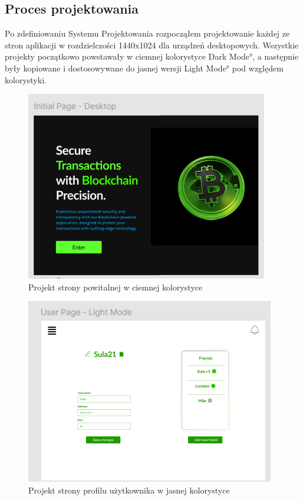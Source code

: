 \subsection{Proces projektowania}
\label{sec:ProcesProjektowania}
Po zdefiniowaniu Systemu Projektowania rozpocząłem projektowanie każdej ze stron aplikacji w rozdzielczości 1440x1024 dla urządzeń desktopowych. Wszystkie projekty początkowo powstawały w ciemnej kolorystyce \ang{Dark Mode}, a następnie były kopiowane i dostosowywane do jasnej wersji \ang{Light Mode} pod względem kolorystyki.
\begin{figure}[!ht]
    \centering
    \includegraphics[width=0.75\linewidth]{Images/figma_projektowanie_1.png}
    \caption{Projekt strony powitalnej w ciemnej kolorystyce}
    \label{fig:enter-label}
\end{figure}
\begin{figure}[!ht]
    \centering
    \includegraphics[width=0.75\linewidth]{Images/figma_projektowanie_2.png}
    \caption{Projekt strony profilu użytkownika w jasnej kolorystyce}
    \label{fig:enter-label}
\end{figure}
